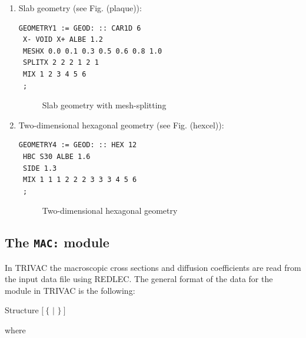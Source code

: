 \begin{enumerate}

\item Slab geometry (see Fig. \fig(plaque)):

\begin{verbatim}
GEOMETRY1 := GEOD: :: CAR1D 6
 X- VOID X+ ALBE 1.2
 MESHX 0.0 0.1 0.3 0.5 0.6 0.8 1.0
 SPLITX 2 2 2 1 2 1
 MIX 1 2 3 4 5 6
 ;
\end{verbatim}

\begin{figure}[htbp]
\begin{center} 
\epsfxsize=9cm
\centerline{ }
\parbox{14cm}{\caption{Slab geometry with mesh-splitting}
\label{fig:plaque}} 
\end{center} 
\end{figure}
 
\item Two-dimensional hexagonal geometry (see Fig. \fig(hexcel)):

\begin{verbatim}
GEOMETRY4 := GEOD: :: HEX 12
 HBC S30 ALBE 1.6
 SIDE 1.3
 MIX 1 1 1 2 2 2 3 3 3 4 5 6
 ;
\end{verbatim}

\begin{figure}[htbp]
\begin{center} 
\epsfxsize=7cm
\centerline{ }
\parbox{14cm}{\caption{Two-dimensional hexagonal geometry}
\label{fig:hexcel}} 
\end{center} 
\end{figure}

\end{enumerate}
\clearpage

\subsection{The {\tt MAC:} module}

In TRIVAC the macroscopic cross sections and diffusion coefficients are read from the input data file using REDLEC. The general format of the data for the  module in TRIVAC is the following:

\begin{DataStructure}{Structure }
 \moc{:=}  $[~\{$  $|$  $\}~]$ \moc{::} 
\end{DataStructure}

\goodbreak
\noindent where

